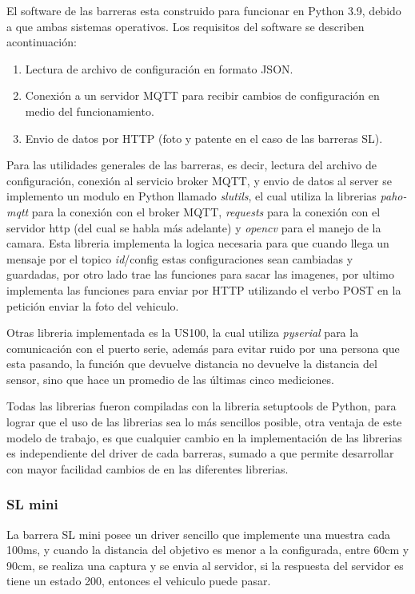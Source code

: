 El software de las barreras esta construido para funcionar en Python 3.9, debido a que ambas sistemas operativos. Los requisitos del software se describen acontinuación:

\begin{enumerate}
    \item Lectura de archivo de configuración en formato JSON.
    \item Conexión a un servidor MQTT para recibir cambios de configuración en medio del funcionamiento.
    \item Envio de datos por HTTP (foto y patente en el caso de las barreras SL).
\end{enumerate}

Para las utilidades generales de las barreras, es decir, lectura del archivo de configuración, conexión al servicio broker MQTT, y envio de datos al server se implemento un modulo en Python llamado \textit{slutils}, el cual utiliza la librerias \textit{paho-mqtt} para la conexión con el broker MQTT, \textit{requests} para la conexión con el servidor http (del cual se habla más adelante) y \textit{opencv} para el manejo de la camara. Esta libreria implementa la logica necesaria para que cuando llega un mensaje por el topico \textit{id}/config estas configuraciones sean cambiadas y guardadas, por otro lado trae las funciones para sacar las imagenes, por ultimo implementa las funciones para enviar por HTTP utilizando el verbo POST en la petición enviar la foto del vehiculo.

Otras libreria implementada es la US100, la cual utiliza \textit{pyserial} para la comunicación con el puerto serie, además para evitar ruido por una persona que esta pasando, la función que devuelve distancia no devuelve la distancia del sensor, sino que hace un promedio de las últimas cinco mediciones.

Todas las librerias fueron compiladas con la libreria setuptools de Python, para lograr que el uso de las librerias sea lo más sencillos posible, otra ventaja de este modelo de trabajo, es que cualquier cambio en la implementación de las librerias es independiente del driver de cada barreras, sumado a que permite desarrollar con mayor facilidad cambios de en las diferentes librerias.

\subsubsection{SL mini}

La barrera SL mini posee un driver sencillo que implemente una muestra cada 100ms, y cuando la distancia del objetivo es menor a la configurada, entre 60cm y 90cm, se realiza una captura y se envia al servidor, si la respuesta del servidor es tiene un estado 200, entonces el vehiculo puede pasar.


